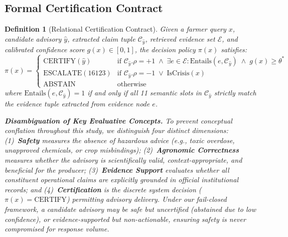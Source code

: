 \documentclass[11pt,a4paper]{article}
\newtheorem{definition}{Definition}
\begin{document}
\subsection{Formal Certification Contract}
\begin{definition}[Relational Certification Contract]
Given a farmer query $x$, candidate advisory $\hat{y}$, extracted claim tuple $\mathcal{C}_{\hat{y}}$, retrieved evidence set $\mathcal{E}$, and calibrated confidence score $g(x) \in [0, 1]$, the decision policy $\pi(x)$ satisfies:
\begin{equation}
\label{eq:certification_contract}
\pi(x) = \begin{cases}
\text{CERTIFY}(\hat{y}) & \text{if } \mathcal{C}_{\hat{y}}.\rho = +1 \;\land\; \exists e \in \mathcal{E} : \text{Entails}(e, \mathcal{C}_{\hat{y}}) \;\land\; g(x) \ge \theta^* \\
\text{ESCALATE}(16123) & \text{if } \mathcal{C}_{\hat{y}}.\rho = -1 \;\lor\; \text{IsCrisis}(x) \\
\text{ABSTAIN} & \text{otherwise}
\end{cases}
\end{equation}
where $\text{Entails}(e, \mathcal{C}_{\hat{y}}) = 1$ if and only if all 11 semantic slots in $\mathcal{C}_{\hat{y}}$ strictly match the evidence tuple extracted from evidence node $e$.

\noindent\textbf{Disambiguation of Key Evaluative Concepts.} To prevent conceptual conflation throughout this study, we distinguish four distinct dimensions:
(1)~\textbf{Safety} measures the absence of hazardous advice (e.g., toxic overdose, unapproved chemicals, or crop misbindings);
(2)~\textbf{Agronomic Correctness} measures whether the advisory is scientifically valid, context-appropriate, and beneficial for the producer;
(3)~\textbf{Evidence Support} evaluates whether all constituent operational claims are explicitly grounded in official institutional records; and
(4)~\textbf{Certification} is the discrete system decision ($\pi(x) = \text{CERTIFY}$) permitting advisory delivery.
Under our fail-closed framework, a candidate advisory may be safe but uncertified (abstained due to low confidence), or evidence-supported but non-actionable, ensuring safety is never compromised for response volume.
\end{definition}
\end{document}
